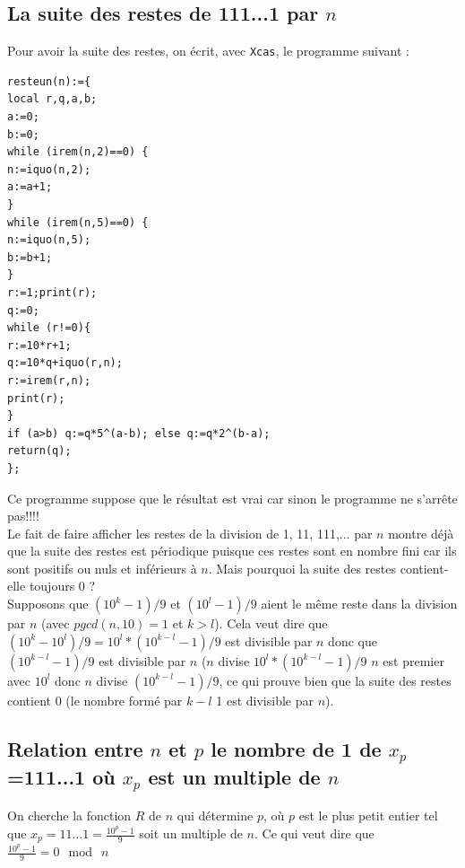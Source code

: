 \documentclass[a4paper,11pt]{book}
\begin{document}
\subsection{La suite des restes de 111...1 par $n$}
Pour avoir la suite des restes, on \'ecrit, avec {\tt Xcas}, le programme 
suivant :
\begin{verbatim}
resteun(n):={
local r,q,a,b;
a:=0;
b:=0;
while (irem(n,2)==0) {
n:=iquo(n,2);
a:=a+1;
}
while (irem(n,5)==0) {
n:=iquo(n,5);
b:=b+1;
}
r:=1;print(r);
q:=0;
while (r!=0){
r:=10*r+1;
q:=10*q+iquo(r,n);
r:=irem(r,n);
print(r);
}
if (a>b) q:=q*5^(a-b); else q:=q*2^(b-a);
return(q);
};
\end{verbatim} 
Ce programme suppose que le r\'esultat est vrai car sinon le programme ne 
s'arr\^ete pas!!!!\\
Le fait de faire afficher les restes de la division de 
1, 11, 111,... par $n$ montre d\'ej\`a que la suite des restes est 
p\'eriodique puisque ces restes sont en nombre fini car ils 
sont positifs ou nuls et inf\'erieurs \`a $n$. Mais pourquoi la suite des
restes contient-elle toujours 0 ? \\
Supposons que $(10^k-1)/9$ et $(10^l-1)/9$ aient le m\^eme reste dans la 
division par $n$ (avec $pgcd(n,10)=1$ et $k>l$). 
Cela veut dire que $(10^k-10^l)/9=10^l*(10^{k-l}-1)/9$ est divisible par $n$
donc que $(10^{k-l}-1)/9$ est divisible par $n$ ($n$ divise 
$10^l*(10^{k-l}-1)/9$ $n$ est premier avec $10^l$ donc $n$ divise 
$(10^{k-l}-1)/9$, ce qui prouve bien que la suite des restes contient 0 (le nombre form\'e par $k-l$ 1 est divisible par $n$).
\subsection{Relation entre $n$ et $p$ le nombre de 1 de $x_p$=111...1 o\`u 
$x_p$ est un multiple de $n$}
On cherche la fonction $R$ de $n$ qui d\'etermine $p$, o\`u $p$ est le plus 
petit entier tel que $x_p=11...1=\frac{10^p-1}{9}$ soit un multiple de $n$.
Ce qui veut dire que $\frac{10^p-1}{9}=0\ \bmod\ n$
\end{document}
